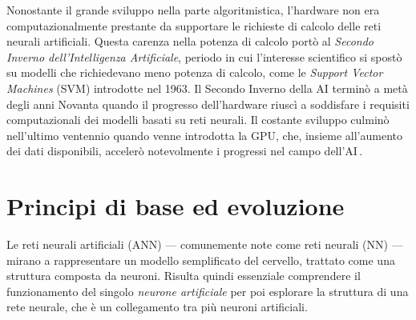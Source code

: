Nonostante il grande sviluppo nella parte algoritmistica, l'hardware non era computazionalmente prestante da supportare le richieste di calcolo delle reti neurali artificiali. Questa carenza nella potenza di calcolo portò al \textsl{Secondo Inverno dell'Intelligenza Artificiale}, periodo in cui l'interesse scientifico si spostò su modelli che richiedevano meno potenza di calcolo, come le \textit{Support Vector Machines} (\acs{SVM}) introdotte nel 1963. Il Secondo Inverno della \acs{AI} terminò a metà degli anni Novanta quando il progresso dell'hardware riuscì a soddisfare i requisiti computazionali dei modelli basati su reti neurali. Il costante sviluppo culminò nell'ultimo ventennio quando venne introdotta la \acs{GPU}, che, insieme all'aumento dei dati disponibili, accelerò notevolmente i progressi nel campo dell'\acs{AI}\,\cite{flasinski2016introduction, muthukrishnan2020brief}.

\section{Principi di base ed evoluzione}
%
Le reti neurali artificiali (\acs{ANN}) — comunemente note come reti neurali (\acs{NN}) — mirano a rappresentare un modello semplificato del cervello, trattato come una struttura composta da neuroni. Risulta quindi essenziale comprendere il funzionamento del singolo \textsl{neurone artificiale} per poi esplorare la struttura di una rete neurale, che è un collegamento tra più neuroni artificiali.

